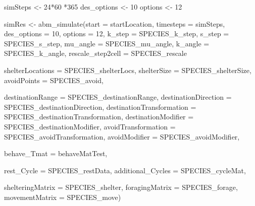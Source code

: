 \documentclass[10pt,a4paper]{article}
\newenvironment{Shaded}{}{}
\newcommand{\AttributeTok}[1]{#1}
\newcommand{\DecValTok}[1]{#1}
\newcommand{\FunctionTok}[1]{#1}
\newcommand{\NormalTok}[1]{#1}
\newcommand{\OtherTok}[1]{#1}
\newcommand{\SpecialCharTok}[1]{#1}
\begin{document}
\begin{Shaded}
\begin{Highlighting}[]
\NormalTok{simSteps }\OtherTok{\textless{}{-}} \DecValTok{24}\SpecialCharTok{*}\DecValTok{60} \SpecialCharTok{*}\DecValTok{365}
\NormalTok{des\_options }\OtherTok{\textless{}{-}} \DecValTok{10}
\NormalTok{options }\OtherTok{\textless{}{-}} \DecValTok{12}

\NormalTok{simRes }\OtherTok{\textless{}{-}} \FunctionTok{abm\_simulate}\NormalTok{(}\AttributeTok{start =}\NormalTok{ startLocation,}
                       \AttributeTok{timesteps =}\NormalTok{ simSteps,}
                       \AttributeTok{des\_options =} \DecValTok{10}\NormalTok{,}
                       \AttributeTok{options =} \DecValTok{12}\NormalTok{,}
                       \AttributeTok{k\_step =}\NormalTok{ SPECIES\_k\_step,}
                       \AttributeTok{s\_step =}\NormalTok{ SPECIES\_s\_step,}
                       \AttributeTok{mu\_angle =}\NormalTok{ SPECIES\_mu\_angle,}
                       \AttributeTok{k\_angle =}\NormalTok{ SPECIES\_k\_angle,}
                       \AttributeTok{rescale\_step2cell =}\NormalTok{ SPECIES\_rescale}
                       
                       \AttributeTok{shelterLocations =}\NormalTok{ SPECIES\_shelterLocs,}
                       \AttributeTok{shelterSize =}\NormalTok{ SPECIES\_shelterSize,}
                       \AttributeTok{avoidPoints =}\NormalTok{ SPECIES\_avoid,}
                       
                       \AttributeTok{destinationRange =}\NormalTok{ SPECIES\_destinationRange,}
                       \AttributeTok{destinationDirection =}\NormalTok{ SPECIES\_destinationDirection,}
                       \AttributeTok{destinationTransformation =}\NormalTok{ SPECIES\_destinationTransformation,}
                       \AttributeTok{destinationModifier =}\NormalTok{ SPECIES\_destinationModifier,}
                       \AttributeTok{avoidTransformation =}\NormalTok{ SPECIES\_avoidTransformation,}
                       \AttributeTok{avoidModifier =}\NormalTok{ SPECIES\_avoidModifier,}
                       
                       \AttributeTok{behave\_Tmat =}\NormalTok{ behaveMatTest,}
                       
                       \AttributeTok{rest\_Cycle =}\NormalTok{ SPECIES\_restData,}
                       \AttributeTok{additional\_Cycles =}\NormalTok{ SPECIES\_cycleMat,}
                       
                       \AttributeTok{shelteringMatrix =}\NormalTok{ SPECIES\_shelter,}
                       \AttributeTok{foragingMatrix =}\NormalTok{ SPECIES\_forage,}
                       \AttributeTok{movementMatrix =}\NormalTok{ SPECIES\_move)}
\end{Highlighting}
\end{Shaded}
\end{document}
